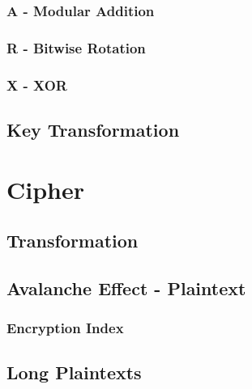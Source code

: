 \documentclass[fleqn, a4paper,12pt]{article}
\begin{document}
\subsubsection{A - Modular Addition} %

\subsubsection{R - Bitwise Rotation} %

\subsubsection{X - XOR} %

\subsection{Key Transformation} %

\section {Cipher}

\subsection{Transformation}

\subsection {Avalanche Effect - Plaintext}

\subsubsection {Encryption Index}

\subsection {Long Plaintexts}
\end{document}
